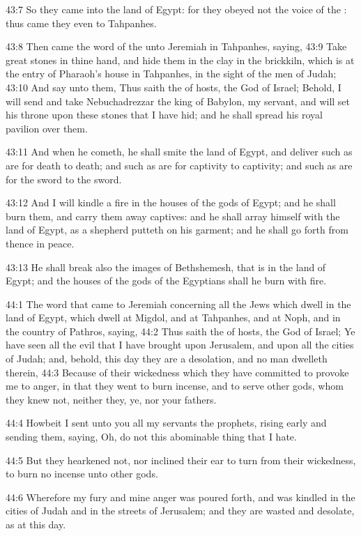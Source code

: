 43:7 So they came into the land of Egypt: for they obeyed not the
voice of the \LORD: thus came they even to Tahpanhes.

43:8 Then came the word of the \LORD unto Jeremiah in Tahpanhes,
saying, 43:9 Take great stones in thine hand, and hide them in the
clay in the brickkiln, which is at the entry of Pharaoh's house in
Tahpanhes, in the sight of the men of Judah; 43:10 And say unto them,
Thus saith the \LORD of hosts, the God of Israel; Behold, I will send
and take Nebuchadrezzar the king of Babylon, my servant, and will set
his throne upon these stones that I have hid; and he shall spread his
royal pavilion over them.

43:11 And when he cometh, he shall smite the land of Egypt, and
deliver such as are for death to death; and such as are for captivity
to captivity; and such as are for the sword to the sword.

43:12 And I will kindle a fire in the houses of the gods of Egypt; and
he shall burn them, and carry them away captives: and he shall array
himself with the land of Egypt, as a shepherd putteth on his garment;
and he shall go forth from thence in peace.

43:13 He shall break also the images of Bethshemesh, that is in the
land of Egypt; and the houses of the gods of the Egyptians shall he
burn with fire.

44:1 The word that came to Jeremiah concerning all the Jews which
dwell in the land of Egypt, which dwell at Migdol, and at Tahpanhes,
and at Noph, and in the country of Pathros, saying, 44:2 Thus saith
the \LORD of hosts, the God of Israel; Ye have seen all the evil that I
have brought upon Jerusalem, and upon all the cities of Judah; and,
behold, this day they are a desolation, and no man dwelleth therein,
44:3 Because of their wickedness which they have committed to provoke
me to anger, in that they went to burn incense, and to serve other
gods, whom they knew not, neither they, ye, nor your fathers.

44:4 Howbeit I sent unto you all my servants the prophets, rising
early and sending them, saying, Oh, do not this abominable thing that
I hate.

44:5 But they hearkened not, nor inclined their ear to turn from their
wickedness, to burn no incense unto other gods.

44:6 Wherefore my fury and mine anger was poured forth, and was
kindled in the cities of Judah and in the streets of Jerusalem; and
they are wasted and desolate, as at this day.

